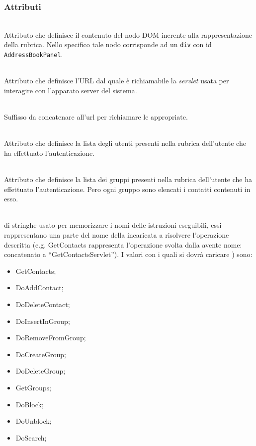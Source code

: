 \subsubsection*{Attributi}
\begin{description}

  \item{}\\
  Attributo che definisce il contenuto del nodo DOM inerente alla rappresentazione della rubrica. Nello specifico tale nodo corrisponde ad un \texttt{div} con id \texttt{AddressBookPanel}.
  \item{}\\
  Attributo che definisce l'URL dal quale è richiamabile la \textit{servlet} usata per interagire con l'apparato server del sistema.
  \item{}\\
Suffisso da concatenare all'url per richiamare le  appropriate.  
  \item{}\\
  Attributo che definisce la lista degli utenti presenti nella rubrica dell'utente che ha effettuato l'autenticazione.
   \item{}\\
  Attributo che definisce la lista dei gruppi presenti nella rubrica dell'utente che ha effettuato l'autenticazione. Pero ogni gruppo sono  elencati i contatti contenuti in esso.
   \item{}\\ 
    di stringhe usato per memorizzare i nomi delle istruzioni eseguibili, essi rappresentano una parte del nome della  incaricata a risolvere l'operazione descritta (e.g. GetContacts rappresenta l'operazione svolta dalla  avente nome:  concatenato a ``GetContactsServlet''). I valori con i quali si dovrà caricare ) sono:
   \begin{itemize}
   	\item GetContacts;
    \item DoAddContact;
    \item DoDeleteContact;
    \item DoInsertInGroup;
    \item DoRemoveFromGroup;
    \item DoCreateGroup;
    \item DoDeleteGroup;
    \item GetGroups;
    \item DoBlock;
    \item DoUnblock;
    \item DoSearch;
   \end{itemize}

\end{description}

